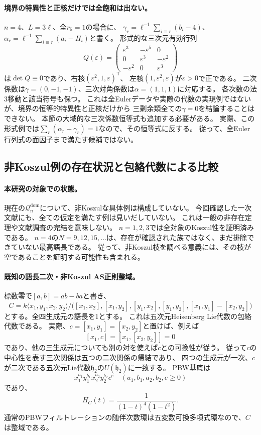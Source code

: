 \documentclass[11pt,a4paper]{ltjsarticle}
\begin{document}
\paragraph{境界の特異性と正核だけでは全飽和は出ない。}
$n=4$、$L=3\ell$、全$r_5=1$の場合に、
$\gamma_r=\ell^{-1}\sum_{i\equiv r}(b_i-4)$、
$\alpha_r=\ell^{-1}\sum_{i\equiv r}(a_i-H_i)$と書く。
形式的な三次元有効行列
\[
Q(\varepsilon)=\begin{pmatrix}
\varepsilon^3&-\varepsilon^5&0\\
0&\varepsilon^3&-\varepsilon^2\\
-\varepsilon^2&0&\varepsilon^3
\end{pmatrix}
\]
は$\det Q\equiv0$であり、右核$(\varepsilon^2,1,\varepsilon)^{\mathsf T}$、
左核$(1,\varepsilon^2,\varepsilon)$が$\varepsilon>0$で正である。
二次係数は$\gamma=(0,-1,-1)$、三次対角係数は$\alpha=(1,1,1)$に対応する。
各次数の法3移動と該当符号も保つ。
これは全Eulerデータや実際の代数の実現例ではないが、境界の恒等的特異性と正核だけから
三剰余類全ての$\gamma=0$を結論することはできない。
本節の大域的な三次係数恒等式も追加する必要がある。
実際、この形式例では$\sum_r(\alpha_r+\gamma_r)=1$なので、その恒等式に反する。
従って、全Euler行列式の面因子まで満たす候補ではない。

\subsection{非Koszul例の存在状況と包絡代数による比較}
\label{note:nonkoszul-existence}
\paragraph{本研究の対象での状態。}
現在の$\mathcal Q_n^{\mathrm{dom}}$について、非Koszulな具体例は構成していない。
今回確認した一次文献にも、全ての仮定を満たす例は見いだしていない。
これは一般の非存在定理や文献調査の完結を意味しない。
$n=1,2,3$では全対象のKoszul性を証明済みである。
$n=4$の$N=9,12,15,\ldots$は、存在が確認された族ではなく、まだ排除できていない最高語長である。
従って、非Koszul枝を調べる意義には、その枝が空であることを証明する可能性も含まれる。

\paragraph{既知の語長二次・非Koszul AS正則整域。}
標数零で$[a,b]=ab-ba$と書き、
\[
C=k\langle x_1,y_1,x_2,y_2\rangle/
\bigl([x_1,x_2],[x_1,y_2],[y_1,x_2],[y_1,y_2],
       [x_1,y_1]-[x_2,y_2]\bigr)
\]
とする。全四生成元の語長を1とする。
これは五次元Heisenberg Lie代数の包絡代数である。
実際、$c=[x_1,y_1]=[x_2,y_2]$と置けば、例えば
\[
[x_1,c]=[x_1,[x_2,y_2]]=0
\]
であり、他の三生成元についても別の対を使えば$c$との可換性が従う。
従って$c$の中心性を表す三次関係は五つの二次関係の帰結であり、
四つの生成元が一次、$c$が二次である五次元Lie代数$\mathfrak h_2$の$U(\mathfrak h_2)$に一致する。
PBW基底は
\[
 x_1^{a_1}y_1^{b_1}x_2^{a_2}y_2^{b_2}c^e
 \quad(a_1,b_1,a_2,b_2,e\ge0)
\]
であり、
\[
 H_C(t)=\frac1{(1-t)^4(1-t^2)}.
\]
通常のPBWフィルトレーションの随伴次数環は五変数可換多項式環なので、$C$は整域である。
\end{document}

